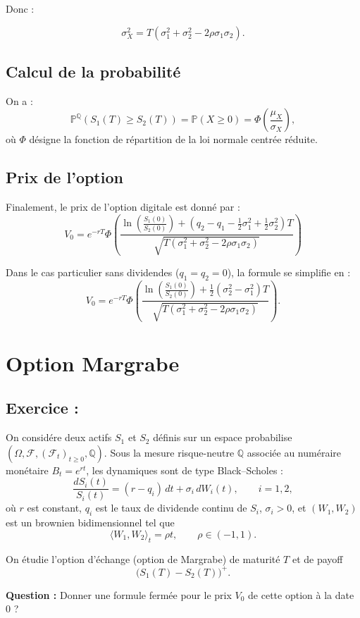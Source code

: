 Donc :

\[
\boxed{
\sigma_X^2
= T \left( \sigma_1^2 + \sigma_2^2 - 2 \rho \sigma_1 \sigma_2 \right).
}
\]



\subsection*{Calcul de la probabilité}

On a :
\[
\mathbb{P}^{\mathbb{Q}}\!\left( S_1(T) \ge S_2(T) \right)
= \mathbb{P}(X \ge 0)
= \Phi\!\left( \frac{\mu_X}{\sigma_X} \right),
\]
où $\Phi$ désigne la fonction de répartition de la loi normale centrée réduite.

\subsection*{Prix de l’option}

Finalement, le prix de l’option digitale est donné par :
\[
\boxed{
V_0
= e^{-rT}
\Phi\!\left(
\frac{
\ln\!\left( \frac{S_1(0)}{S_2(0)} \right)
+ \left(q_2 - q_1 - \tfrac12 \sigma_1^2 + \tfrac12 \sigma_2^2 \right) T
}{
\sqrt{
T \left( \sigma_1^2 + \sigma_2^2 - 2 \rho \sigma_1 \sigma_2 \right)
}
}
\right)
}
\]

\medskip

\noindent
Dans le cas particulier sans dividendes ($q_1 = q_2 = 0$), la formule se simplifie en :
\[
V_0
= e^{-rT}
\Phi\!\left(
\frac{
\ln\!\left( \frac{S_1(0)}{S_2(0)} \right)
+ \tfrac12 (\sigma_2^2 - \sigma_1^2) T
}{
\sqrt{
T \left( \sigma_1^2 + \sigma_2^2 - 2 \rho \sigma_1 \sigma_2 \right)
}
}
\right).
\]



\section{Option Margrabe}


\subsection*{Exercice :}

\begin{exerciseBox}

On considére deux actifs $S_1$ et $S_2$ définis sur un espace probabilise
$(\Omega,\mathcal{F},(\mathcal{F}_t)_{t\ge 0},\mathbb{Q})$.
Sous la mesure risque-neutre $\mathbb{Q}$ associ\'ee au num\'eraire mon\'etaire
$B_t=e^{rt}$, les dynamiques sont de type Black--Scholes :
\[
\frac{dS_i(t)}{S_i(t)}=(r-q_i)\,dt+\sigma_i\,dW_i(t),\qquad i=1,2,
\]
o\`u $r$ est constant, $q_i$ est le taux de dividende continu de $S_i$,
$\sigma_i>0$, et $(W_1,W_2)$ est un brownien bidimensionnel tel que
\[
\langle W_1,W_2\rangle_t=\rho t,\qquad \rho\in(-1,1).
\]

On \'{e}tudie l'option d'\'echange (option de Margrabe) de maturit\'e $T$ et de payoff
\[
\big(S_1(T)-S_2(T)\big)^+.
\]

\medskip
\noindent
\textbf{Question :} Donner une formule fermée pour le prix $V_0$ de cette option à la date $0$ ?
\end{exerciseBox}

